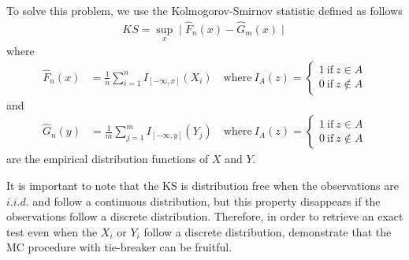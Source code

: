 \documentclass[]{article}\usepackage[]{graphicx}\usepackage[]{color}
\begin{document}
To solve this problem, we use the Kolmogorov-Smirnov statistic \citep{smirnoff_sur_1939,smirnov_table_1948} defined as follows
 \begin{align}
	KS = \sup_x \mid\hat{F}_{n}(x) - \hat{G}_{m}(x)\mid
	\end{align}
	where
	\begin{align}
	\hat{F}_{n}(x) & =\frac{1}{n}\sum_{i=1}^{n}I_{[-\infty,x]}(X_i) \quad \mathrm{where} \ I_{A}(z)=\left\{\begin{array}{l}
		1\ \mathrm{if}\ z\in A\\
		0\ \mathrm{if}\ z\not\in A
	\end{array}\right.
	\end{align}
	and
	\begin{align}
	\hat{G}_{n}(y) & =\frac{1}{m}\sum_{j=1}^{m}I_{[-\infty,y]}(Y_j) \quad \mathrm{where} \ I_{A}(z)=\left\{\begin{array}{l}
		1\ \mathrm{if}\ z\in A\\
		0\ \mathrm{if}\ z\not\in A
	\end{array}\right.
	\end{align}
	are the empirical distribution functions of $X$ and $Y$.

	It is important to note that the KS is distribution free when the observations are $i.i.d.$ and follow a continuous distribution, but this property disappears if the observations follow a discrete distribution. Therefore, in order to retrieve an exact test even when the $X_i$ or $Y_i$ follow a discrete distribution, \cite{dufour_exact_2001} demonstrate that the MC procedure with tie-breaker can be fruitful.
\end{document}
